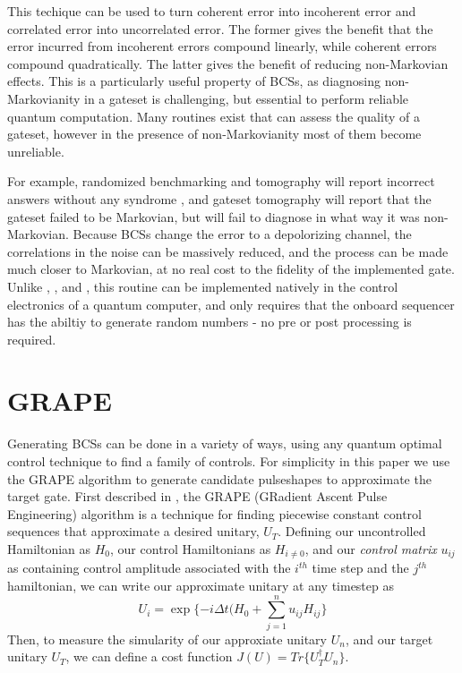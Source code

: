 \documentclass[aps,nofootinbib,pra,notitlepage,twocolumn]{revtex4-1}
\begin{document}
This techique can be used to turn coherent error into incoherent error and correlated error into uncorrelated error. The former gives the benefit that the error incurred from incoherent errors compound linearly, while coherent errors compound quadratically. The latter gives the benefit of reducing non-Markovian effects. This is a particularly useful property of BCSs, as diagnosing non-Markovianity in a gateset is challenging, but essential to perform reliable quantum computation. Many routines exist that can assess the quality of a gateset, however in the presence of non-Markovianity most of them become unreliable.

For example, randomized benchmarking and tomography will report incorrect answers without any syndrome \cite{Merkel2013}, and gateset tomography will report that the gateset failed to be Markovian, but will fail to diagnose in what way it was non-Markovian. Because BCSs change the error to a depolorizing channel, the correlations in the noise can be massively reduced, and the process can be made much closer to Markovian, at no real cost to the fidelity of the implemented gate. Unlike \cite{Ware2018}, \cite{Wallman2016}, and \citep{Campbell2017}, this routine can be implemented natively in the control electronics of a quantum computer, and only requires that the onboard sequencer has the abiltiy to generate random numbers - no pre or post processing is required.

\section{GRAPE}\label{GRAPE}
Generating BCSs can be done in a variety of ways, using any quantum optimal control technique \cite{Caneva2011, Machnes2018} to find a family of controls. For simplicity in this paper we use the GRAPE algorithm to generate candidate pulseshapes to approximate the target gate. First described in \cite{Khaneja2005}, the GRAPE (GRadient Ascent Pulse Engineering) algorithm is a technique for finding piecewise constant control sequences that approximate a desired unitary, $U_T$. Defining our uncontrolled Hamiltonian as $H_0$, our control Hamiltonians as $H_{i\neq 0}$, and our \textit{control matrix} $u_{ij}$ as containing control amplitude associated with the $i^{th}$ time step and the $j^{th}$ hamiltonian, we can write our approximate unitary at any timestep as
\begin{equation}\label{eq:3}
  U_i = \exp\{-i\Delta t(H_0 + \sum_{j=1}^{n}u_{ij}H_{ij}\}
\end{equation}
Then, to measure the simularity of our approxiate unitary $U_n$, and our target unitary $U_T$, we can define a cost function $J(U) = Tr\{U_T^{\dagger}U_n\}$.
\end{document}

